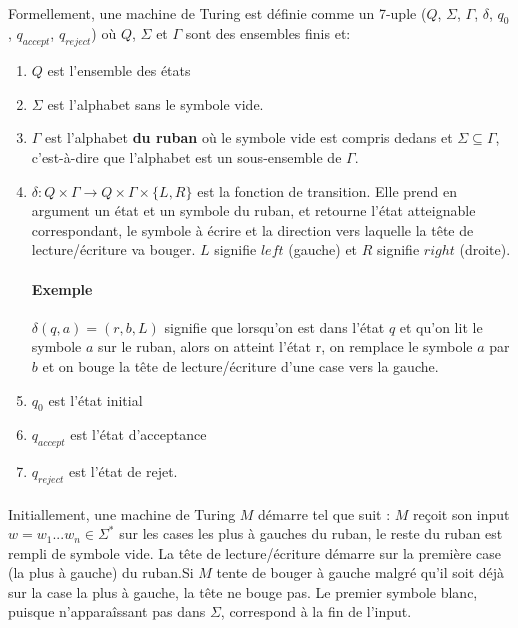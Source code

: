 \paragraph{}
Formellement, une machine de Turing est définie comme un 7-uple ($Q$, $\Sigma$, $\Gamma$, $\delta$, $q_{0}$, $q_{accept}$, $q_{reject}$) où $Q$, $\Sigma$ et $\Gamma$ sont des ensembles finis et:
\begin{enumerate}
\item $Q$ est l'ensemble des états
\item $\Sigma$ est l'alphabet sans le symbole vide.
\item $\Gamma$ est l'alphabet \textbf{du ruban} où le symbole vide est compris dedans et $\Sigma \subseteq \Gamma$, c'est-à-dire que l'alphabet est un sous-ensemble de $\Gamma$.
\item $\delta : Q \times \Gamma \rightarrow Q \times \Gamma \times \{L, R\}$ est la fonction de transition. Elle prend en argument un état et un symbole du ruban, et retourne l'état atteignable correspondant, le symbole à écrire et la direction vers laquelle la tête de lecture/écriture va bouger. $L$ signifie $left$ (gauche) et $R$ signifie $right$ (droite).
\paragraph{Exemple} $\delta(q, a) = (r, b, L)$ signifie que lorsqu'on est dans l'état $q$ et qu'on lit le symbole $a$ sur le ruban, alors on atteint l'état r, on remplace le symbole $a$ par $b$ et on bouge la tête de lecture/écriture d'une case vers la gauche.
\item $q_{0}$ est l'état initial 
\item $q_{accept}$ est l'état d'acceptance 
\item $q_{reject}$ est l'état de rejet.
\end{enumerate}

\paragraph{}
Initiallement, une machine de Turing $M$ démarre tel que suit : $M$ reçoit son input $w = w_{1}...w_{n} \in \Sigma^{*}$ sur les cases les plus à gauches du ruban, le reste du ruban est rempli de symbole vide. La tête de lecture/écriture démarre sur la première case (la plus à gauche) du ruban.Si $M$ tente de bouger à gauche malgré qu'il soit déjà sur la case la plus à gauche, la tête ne bouge pas. Le premier symbole blanc, puisque n'apparaîssant pas dans $\Sigma$, correspond à la fin de l'input.

